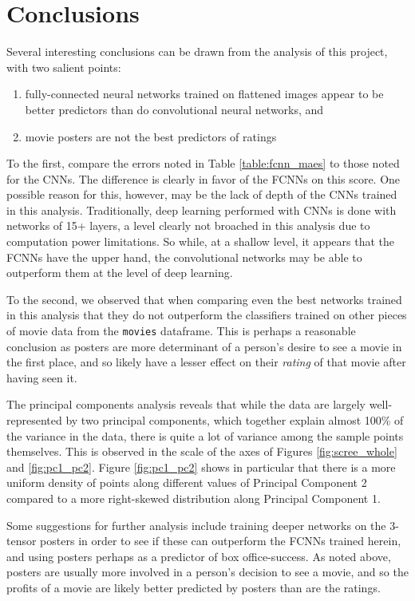 \documentclass[12pt, oneside]{article}   	%
\begin{document}
\section{Conclusions}

Several interesting conclusions can be drawn from the analysis of this project, with two salient points:
\begin{enumerate}
\item fully-connected neural networks trained on flattened images appear to be better predictors than do convolutional neural networks, and
\item movie posters are not the best predictors of ratings
\end{enumerate}

To the first, compare the errors noted in Table \ref{table:fcnn_maes} to those noted for the CNNs. The difference is clearly in favor of the FCNNs on this score. One possible reason for this, however, may be the lack of depth of the CNNs trained in this analysis. Traditionally, deep learning performed with CNNs is done with networks of 15+ layers, a level clearly not broached in this analysis due to computation power limitations. So while, at a shallow level, it appears that the FCNNs have the upper hand, the convolutional networks may be able to outperform them at the level of deep learning.

To the second, we observed that when comparing even the best networks trained in this analysis that they do not outperform the classifiers trained on other pieces of movie data from the \texttt{movies} dataframe. This is perhaps a reasonable conclusion as posters are more determinant of a person's desire to see a movie in the first place, and so likely have a lesser effect on their \textit{rating} of that movie after having seen it. 

The principal components analysis reveals that while the data are largely well-represented by two principal components, which together explain almost 100\% of the variance in the data, there is quite a lot of variance among the sample points themselves. This is observed in the scale of the axes of Figures \ref{fig:scree_whole} and \ref{fig:pc1_pc2}. Figure \ref{fig:pc1_pc2} shows in particular that there is a more uniform density of points along different values of Principal Component 2 compared to a more right-skewed distribution along Principal Component 1.

Some suggestions for further analysis include training deeper networks on the 3-tensor posters in order to see if these can outperform the FCNNs trained herein, and using posters perhaps as a predictor of box office-success. As noted above, posters are usually more involved in a person's decision to see a movie, and so the profits of a movie are likely better predicted by posters than are the ratings.
\end{document}
